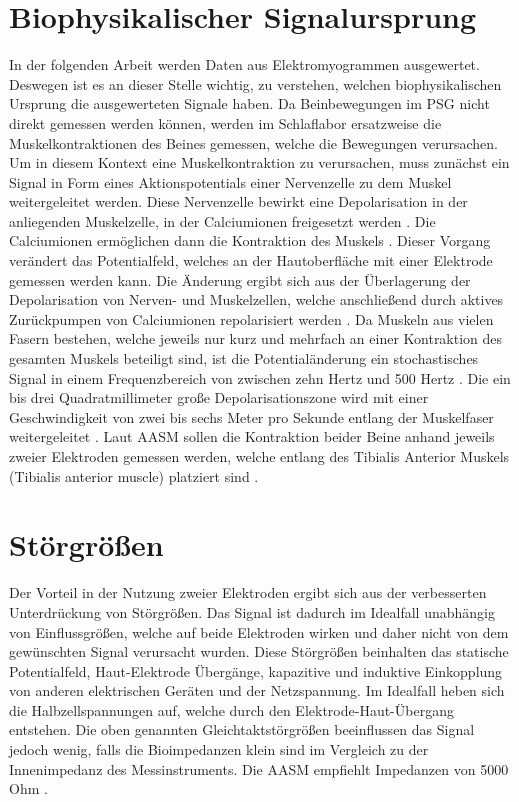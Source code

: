\section{Biophysikalischer Signalursprung}

In der folgenden Arbeit werden Daten aus Elektromyogrammen ausgewertet. Deswegen ist es an dieser Stelle wichtig, zu verstehen, welchen biophysikalischen Ursprung die ausgewerteten Signale haben. 
Da Beinbewegungen im PSG nicht direkt gemessen werden können, werden im Schlaflabor ersatzweise die Muskelkontraktionen des Beines gemessen, welche die Bewegungen verursachen. Um in diesem Kontext eine Muskelkontraktion zu verursachen, muss zunächst ein Signal in Form eines Aktionspotentials einer Nervenzelle zu dem Muskel weitergeleitet werden. Diese Nervenzelle bewirkt eine Depolarisation in der anliegenden Muskelzelle, in der Calciumionen freigesetzt werden \cite{biomechanist}. Die Calciumionen ermöglichen dann die Kontraktion des Muskels \cite{motorischeEndplatte}. Dieser Vorgang verändert das Potentialfeld, welches an der Hautoberfläche mit einer Elektrode gemessen werden kann. Die Änderung ergibt sich aus der Überlagerung der Depolarisation von Nerven- und Muskelzellen, welche anschließend durch aktives Zurückpumpen von Calciumionen repolarisiert werden \cite{motorischeEndplatte}. Da Muskeln aus vielen Fasern bestehen, welche jeweils nur kurz und mehrfach an einer Kontraktion des gesamten Muskels beteiligt sind, ist die Potentialänderung ein stochastisches Signal in einem Frequenzbereich von zwischen zehn Hertz und 500 Hertz \cite{Mehrkanal-BioimpedanzInstrumentierung}. Die ein bis drei Quadratmillimeter große Depolarisationszone wird mit einer Geschwindigkeit von zwei bis sechs Meter pro Sekunde entlang der Muskelfaser weitergeleitet \cite{biomechanist}.
Laut AASM sollen die Kontraktion beider Beine anhand jeweils zweier Elektroden gemessen werden, welche entlang des Tibialis Anterior Muskels (Tibialis anterior muscle) platziert sind \cite{AASM}. 

\section{Störgrößen}
Der Vorteil in der Nutzung zweier Elektroden ergibt sich aus der verbesserten Unterdrückung von Störgrößen. Das Signal ist dadurch im Idealfall unabhängig von Einflussgrößen, welche auf beide Elektroden wirken und daher nicht von dem gewünschten Signal verursacht wurden. Diese Störgrößen beinhalten das statische Potentialfeld, Haut-Elektrode Übergänge, kapazitive und induktive Einkopplung von anderen elektrischen Geräten und der Netzspannung. 
Im Idealfall heben sich die Halbzellspannungen auf, welche durch den Elektrode-Haut-Übergang entstehen. Die oben genannten Gleichtaktstörgrößen beeinflussen das Signal jedoch wenig, falls die Bioimpedanzen klein sind im Vergleich zu der Innenimpedanz des Messinstruments. Die AASM empfiehlt Impedanzen von 5000 Ohm \cite{AASM}. \cite{Mehrkanal-BioimpedanzInstrumentierung}

